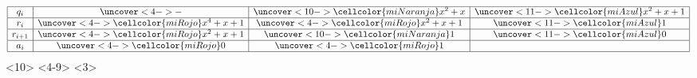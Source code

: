 \documentclass[10pt,t]{beamer}
\begin{document}
\begin{frame}
{\begin{plainexample}
{{{{\[                        \]
                    }{
                        \[
                            \begin{array}{|c|c|c|c|}
                                \hline
                                q_i     &  \uncover<4->{-} &
                                \uncover<10->{\cellcolor{miNaranja}x^2 + x}    &
                                    \uncover<11->{\cellcolor{miAzul}x^2 + x + 1} \\
                                \hline
                                r_i    &  \uncover<4->{\cellcolor{miRojo}x^4 + x + 1} & 
                                    \uncover<4->{\cellcolor{miRojo}x^2 + x + 1} &
                                    \uncover<11->{\cellcolor{miAzul}1 }          \\
                                \hline
                                r_{i+1} &  \uncover<4->{\cellcolor{miRojo}x^2 + x + 1} &
                                \uncover<10->{\cellcolor{miNaranja}1}&
                                    \uncover<11->{\cellcolor{miAzul} 0}        \\
                                \hline
                                a_i     &\uncover<4->{\cellcolor{miRojo}0}            & 
                                \uncover<4->{\cellcolor{miRojo}1}          & 
                                \\
                                \hline
                            \end{array}
                        \]
                    }<10>
                }<4-9>
            }<3>
        }
        \vspace{-0.3em}
    \end{plainexample}
    }


\end{frame}
\end{document}
